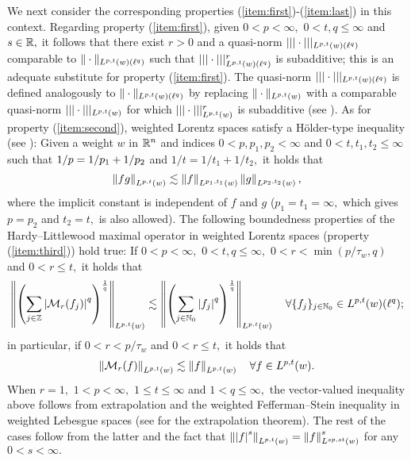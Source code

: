  We next consider the corresponding properties (\ref{item:first})-(\ref{item:last}) in this context. Regarding property (\ref{item:first}), given $0<p<\infty,$  $0<t,q\le \infty$   and $s\in \mathbb{R},$   it follows that there exist $r>0$ and a quasi-norm $|||\cdot |||_{L^{p,t}(w)(\ell^q)}$ comparable to $\|\cdot\|_{L^{p,t}(w)(\ell^q)}$ such that $|||\cdot |||^r_{L^{p,t}(w)(\ell^q)}$ is subadditive; this is an adequate substitute for property (\ref{item:first}). The quasi-norm $|||\cdot |||_{L^{p,t}(w)(\ell^q)}$ is defined analogously to $\|\cdot \|_{L^{p,t}(w)(\ell^q)}$ by replacing $\|\cdot \|_{L^{p,t}(w)}$ with a comparable quasi-norm $|||\cdot |||_{L^{p,t}(w)}$ for which $|||\cdot |||^r_{L^{p,t}(w)}$ is subadditive (see \cite[p. 258,
  (2.2)]{MR0223874}). As for property (\ref{item:second}), weighted Lorentz spaces satisfy a  H\"older-type inequality (see \cite[Thm 4.5]{MR0223874}): Given a weight $w$ in ${{\mathbb R}^n}$ and indices $0<p, p_1,p_2<\infty$ and $ 0<t, t_1,t_2\le \infty$  such that $1/p=1/p_1+1/p_2$ and $1/t=1/t_1+1/t_2,$ it holds that
  \begin{equation*}
  \left\|fg\right\|_{L^{p,t}(w)}\lesssim \left\|f\right\|_{L^{p_1,t_1}(w)} \left\|g\right\|_{L^{p_2,t_2}(w)},
  \end{equation*}
 where the implicit constant is independent of $f$ and $g$ ($p_1=t_1=\infty,$ which gives $p=p_2$ and $t_2=t,$ is also allowed). The following boundedness properties of the Hardy--Littlewood maximal operator in  weighted Lorentz spaces (property (\ref{item:third})) hold true: 
  If $0<p<\infty,$  $0<t,q\le\infty,$  $0<r<\min(p/\tau_w,q)$ and $0<r\le t,$ it holds that
\begin{equation}\label{eq:FTLorentz}
\left\|\left(\sum_{j\in\mathbb{Z}} \left\vert \mathcal{M}_r(f_j) \right\vert^q\right)^{\frac{1}{q}}\right\|_{L^{p,t}(w)}\lesssim \left\|\left(\sum_{j\in\mathbb{N}_0} \left\vert f_j \right\vert^q\right)^{\frac{1}{q}}\right\|_{L^{p,t}(w)}\quad \forall \{f_j\}_{j\in \mathbb{N}_0}\in L^{p,t}(w)(\ell^q);  
\end{equation}
in particular, if $0<r<p/\tau_w$ and $0<r\le t,$ it holds that 
\begin{equation*}
\left\|\mathcal{M}_r(f)\right\|_{L^{p,t}(w)}\lesssim \left\|f\right\|_{L^{p,t}(w)}\quad \forall f\in L^{p,t}(w). 
\end{equation*}
When $r=1,$ $1<p<\infty,$  $1\le t\le \infty$ and $1<q\le \infty,$  the vector-valued inequality above follows from extrapolation and the weighted Fefferman--Stein inequality in weighted Lebesgue spaces (see   \cite[Theorem 4.10 and comments on p. 70]{MR2797562} for the extrapolation theorem).
The rest of the cases follow from the latter and the fact that $\left\|\left\vert f \right\vert^s\right\|_{L^{p,t}(w)}=\left\|f\right\|_{L^{sp,st}(w)}^s$ for any $0<s<\infty.$ 
